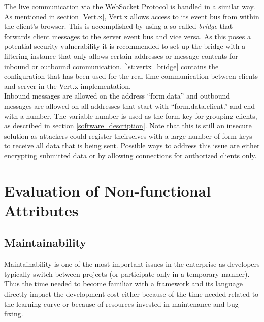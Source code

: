 The live communication via the WebSocket Protocol is handled in a similar way. As mentioned in section
\ref{Vert.x}, Vert.x allows access to its event bus from within the client's browser.
This is accomplished by using a so-called \textit{bridge} that forwards client messages to
the server event bus and vice versa. As this poses a potential security vulnerability
it is recommended to set up the bridge with a filtering instance that only allows certain
addresses or message contents for inbound or outbound communication. \autoref{lst:vertx_bridge} contains
the configuration that has been used for the real-time communication between clients
and server in the Vert.x implementation.\\
Inbound messages are allowed on the address ``form.data'' and outbound messages
are allowed on all addresses that start with ``form.data.client.'' and end with a number.
The variable number is used as the form key for grouping clients, as described in section
\ref{software_description}. Note that this is still an insecure solution as attackers
could register theirselves with a large number of form keys to receive all data that
is being sent. Possible ways to address this issue are either encrypting submitted
data or by allowing connections for authorized clients only.




\newpage
\section{Evaluation of Non-functional Attributes}
\label{evaluation_nonfunctional}

\subsection{Maintainability}
\label{maintainability}
Maintainability is one of the most important issues in the enterprise as
developers typically switch between projects (or participate only in a temporary
manner). Thus the time needed to become familiar with a framework and its
language directly impact the development cost either because of the time needed
related to the learning curve or because of resources invested in maintenance
and bug-fixing.

